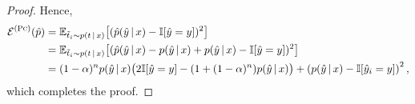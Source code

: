 \begin{proof}
Hence,
\begin{equation*}
    \begin{aligned}
      \mathcal{E}^{(\textsc{Pc})}(\hat{p}) &= \mathbb{E}_{\tilde{t}_i \sim p(t \,|\, x)} \big[( \hat{p}(\hat{y} \,|\, x) - \mathbb{I}[\hat{y} = y] )^2 \big] \\
	& =\mathbb{E}_{\tilde{t}_i \sim p(t \,|\, x)}\big[(\hat{p}(\hat{y} \,|\, x) - p(\hat{y} \,|\, x) + p(\hat{y} \,|\, x) - \mathbb{I}[\hat{y} = y] )^2 \big] \\
	&= (1 - \alpha)^{n} p(\hat{y} \,|\, x) \big(2\mathbb{I}[\hat{y}=y] - (1 + (1 - \alpha)^{n}) p(\hat{y} \,|\, x) \big) +  \left( p(\hat{y} \,|\, x) - \mathbb{I}[\hat{y}_i = y] \right )^2,
    \end{aligned}
    \end{equation*}
which completes the proof.
\end{proof}

